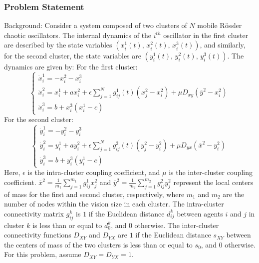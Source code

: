 \documentclass[10pt]{article}
\begin{document}
\subsubsection*{Problem Statement}
Background:
Consider a system composed of two clusters of $N$ mobile R\"ossler chaotic oscillators. The internal dynamics of the $i^{th}$ oscillator in the first cluster are described by the state variables ${\left( {{x^{1}_i}\left( t \right),\,{x^{2}_i}\left( t \right),\,{x^{3}_i}\left( t \right)} \right)}$, and similarly, for the second cluster, the state variables are ${\left( {{y^{1}_i}\left( t \right),\,{y^{2}_i}\left( t \right),\,{y^{3}_i}\left( t \right)} \right)}$. The dynamics are given by:
For the first cluster:
$$
\left\{ \begin{array}{l}
\dot x_i^1 =  - x_i^2 - x_i^3\\
\dot x_i^2 = x_i^1 + ax_i^2 + {\epsilon }\sum\limits_{j = 1}^N {g_{ij}^1(t)\left( {x_j^2 - x_i^2} \right)} + \mu {D_{xy}}\left( {\overline {y}^2   - x_i^2} \right) \\
\dot x_i^3 = b + x_i^3\left( {x_i^1 - c} \right)
\end{array} \right.
$$
For the second cluster:
$$
\left\{ \begin{array}{l}
\dot y_i^1 =  - y_i^2 - y_i^3\\
\dot y_i^2 = y_i^1 + ay_i^2 + {\epsilon }\sum\limits_{j = 1}^N {g_{ij}^2(t)\left( {y_j^2 - y_i^2} \right)} + \mu {D_{yx}}\left( {\overline {x}^2   - y_i^2} \right) \\
\dot y_i^3 = b + y_i^3\left( {y_i^1 - c} \right)
\end{array} \right.
$$
Here, $\epsilon$ is the intra-cluster coupling coefficient, and $\mu$ is the inter-cluster coupling coefficient. $\overline{x}^2 = \frac{1}{m_1}\sum_{j=1}^{m_1} g_{ij}^1x_j^2$ and $\overline{y}^2 = \frac{1}{m_2}\sum_{j=1}^{m_2} g_{ij}^2y_j^2$ represent the local centers of mass for the first and second cluster, respectively, where $m_1$ and $m_2$ are the number of nodes within the vision size in each cluster. The intra-cluster connectivity matrix $g_{ij}^k$ is $1$ if the Euclidean distance $d_{ij}^k$ between agents $i$ and $j$ in cluster $k$ is less than or equal to $d_0^k$, and $0$ otherwise. The inter-cluster connectivity functions $D_{XY}$ and $D_{YX}$ are $1$ if the Euclidean distance $s_{XY}$ between the centers of mass of the two clusters is less than or equal to $s_0$, and $0$ otherwise. For this problem, assume $D_{XY} = D_{YX} = 1$.
\end{document}
